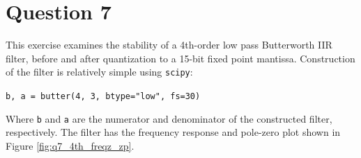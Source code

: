 \section*{Question 7}

This exercise examines the stability of a 4th-order low pass Butterworth IIR filter, before and after quantization to a 15-bit fixed point mantissa. Construction of the filter is relatively simple using \texttt{scipy}:
\begin{center}
    \texttt{b, a = butter(4, 3, btype="low", fs=30)}
\end{center}
Where \texttt{b} and \texttt{a} are the numerator and denominator of the constructed filter, respectively. The filter has the frequency response and pole-zero plot shown in Figure \ref{fig:q7_4th_freqz_zp}.


